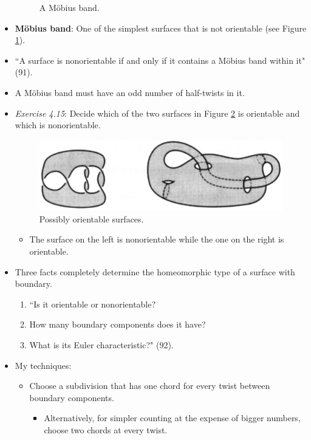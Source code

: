 \documentclass[titlepage]{article}
\numberwithin{figure}{section}
\numberwithin{table}{section}
\numberwithin{equation}{section}
\newcommand{\dq}[2]{``#1" (#2).}
\begin{document}
\begin{itemize}
\begin{figure}[h!]
        \caption{A M\"{o}bius band.}
        \label{fig:mobius}
    \end{figure}
    \item \textbf{M\"{o}bius band}: One of the simplest surfaces that is not orientable (see Figure \ref{fig:mobius}).
    \item \dq{A surface is nonorientable if and only if it contains a M\"{o}bius band within it}{91}
    \item A M\"{o}bius band must have an odd number of half-twists in it.
    \item \emph{Exercise 4.15}: Decide which of the two surfaces in Figure \ref{fig:orients} is orientable and which is nonorientable.
    \begin{figure}[H]
        \centering
        \includegraphics[width=0.6\linewidth]{Blender/ex4-15.png}
        \caption{Possibly orientable surfaces.}
        \label{fig:orients}
    \end{figure}
    \begin{itemize}
        \item The surface on the left is nonorientable while the one on the right is orientable.
    \end{itemize}
    \item Three facts completely determine the homeomorphic type of a surface with boundary.
    \begin{enumerate}
        \item \dq{Is it orientable or nonorientable?
        \item How many boundary components does it have?
        \item What is its Euler characteristic?}{92}
    \end{enumerate}
    \item My techniques:
    \begin{itemize}
        \item Choose a subdivision that has one chord for every twist between boundary components.
        \begin{itemize}
            \item Alternatively, for simpler counting at the expense of bigger numbers, choose two chords at every twist.
        \end{itemize}

\end{itemize}
\end{itemize}
\end{document}
